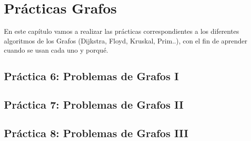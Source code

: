 \chapter{Prácticas Grafos}

En este capítulo vamos a realizar las prácticas correspondientes a los diferentes algoritmos de los Grafos (Dijkstra, Floyd, Kruskal, Prim..), con el fin de aprender cuando se usan cada uno y porqué.

\section*{Práctica 6: Problemas de Grafos I}
{}
\label{sec:practica6}


\section*{Práctica 7: Problemas de Grafos II}
{}
\label{sec:practica7}


\section*{Práctica 8: Problemas de Grafos III}
{}
\label{sec:practica8}
